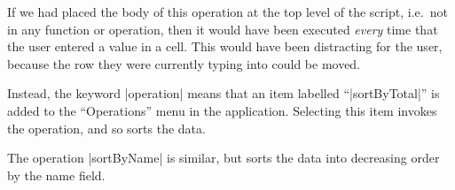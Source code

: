 If we had placed the body of this operation at the top level of the script,
i.e.~not in any function or operation, then it would have been executed
\emph{every} time that the user entered a value in a cell.  This would have
been distracting for the user, because the row they were currently typing into
could be moved.

Instead, the keyword |operation| means that an item labelled ``|sortByTotal|''
is added to the ``Operations'' menu in the application.  Selecting this item
invokes the operation, and so sorts the data.


The operation |sortByName| is similar, but sorts the data into decreasing
order by the name field.
